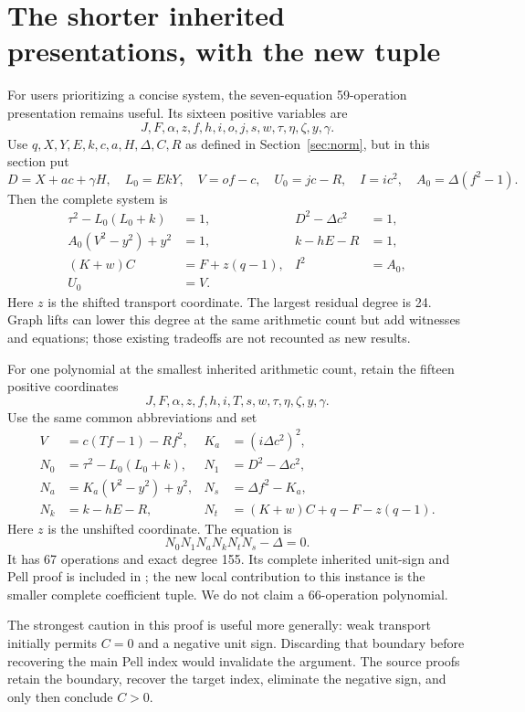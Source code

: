 \section{The shorter inherited presentations, with the new tuple}

For users prioritizing a concise system, the seven-equation 59-operation
presentation remains useful. Its sixteen positive variables are
\[
 J,F,\alpha,z,f,h,i,o,j,s,w,\tau,\eta,\zeta,y,\gamma.
\]
Use $q,X,Y,E,k,c,a,H,\Delta,C,R$ as defined in Section~\ref{sec:norm},
but in this section put
\[
 D=X+ac+\gamma H,\quad L_0=EkY,\quad V=of-c,\quad
 U_0=jc-R,\quad I=ic^2,\quad A_0=\Delta(f^2-1).
\]
Then the complete system is
\begin{equation}\label{eq:system59}
 \begin{aligned}
 \tau^2-L_0(L_0+k)&=1, & D^2-\Delta c^2&=1,\\
 A_0(V^2-y^2)+y^2&=1, & k-hE-R&=1,\\
 (K+w)C&=F+z(q-1), & I^2&=A_0,\\
 U_0&=V.
 \end{aligned}
\end{equation}
Here $z$ is the shifted transport coordinate. The largest residual degree
is 24. Graph lifts can lower this degree at the same arithmetic count but
add witnesses and equations; those existing tradeoffs are not recounted as
new results.

For one polynomial at the smallest inherited arithmetic count, retain the
fifteen positive coordinates
\[
 J,F,\alpha,z,f,h,i,T,s,w,\tau,\eta,\zeta,y,\gamma.
\]
Use the same common abbreviations and set
\begin{align*}
 V&=c(Tf-1)-Rf^2,&K_a&=(i\Delta c^2)^2,\\
 N_0&=\tau^2-L_0(L_0+k),&N_1&=D^2-\Delta c^2,\\
 N_a&=K_a(V^2-y^2)+y^2,&N_s&=\Delta f^2-K_a,\\
 N_k&=k-hE-R,&N_t&=(K+w)C+q-F-z(q-1).
\end{align*}
Here $z$ is the unshifted coordinate. The equation is
\begin{equation}\boxed{
 N_0N_1N_aN_kN_tN_s-\Delta=0.}\label{eq:p67}
\end{equation}
It has 67 operations and exact degree 155. Its complete inherited
unit-sign and Pell proof is included in ;
the new local contribution to this instance is the smaller complete
coefficient tuple. We do not claim a 66-operation polynomial.

The strongest caution in this proof is useful more generally: weak
transport initially permits $C=0$ and a negative unit sign. Discarding
that boundary before recovering the main Pell index would invalidate the
argument. The source proofs retain the boundary, recover the target index,
eliminate the negative sign, and only then conclude $C>0$.

